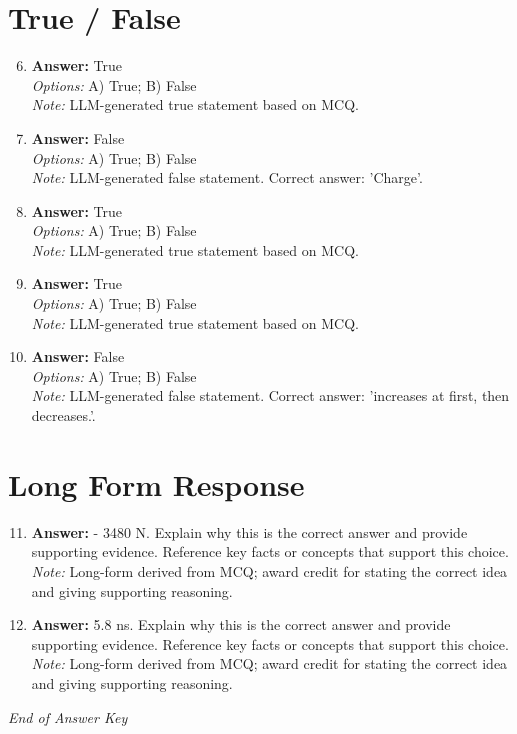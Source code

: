 \documentclass[12pt]{article}
\begin{document}
\section*{True / False}
\begin{enumerate}[label=\arabic*.]
\setcounter{enumi}{5}
\item \textbf{Answer:} True
\\ \textit{Options:} A) True; B) False
\\ \textit{Note:} LLM-generated true statement based on MCQ.
\item \textbf{Answer:} False
\\ \textit{Options:} A) True; B) False
\\ \textit{Note:} LLM-generated false statement. Correct answer: 'Charge'.
\item \textbf{Answer:} True
\\ \textit{Options:} A) True; B) False
\\ \textit{Note:} LLM-generated true statement based on MCQ.
\item \textbf{Answer:} True
\\ \textit{Options:} A) True; B) False
\\ \textit{Note:} LLM-generated true statement based on MCQ.
\item \textbf{Answer:} False
\\ \textit{Options:} A) True; B) False
\\ \textit{Note:} LLM-generated false statement. Correct answer: 'increases at first, then decreases.'.
\end{enumerate}

\section*{Long Form Response}
\begin{enumerate}[label=\arabic*.]
\setcounter{enumi}{10}
\item \textbf{Answer:} - 3480 N. Explain why this is the correct answer and provide supporting evidence. Reference key facts or concepts that support this choice.
\\ \textit{Note:} Long-form derived from MCQ; award credit for stating the correct idea and giving supporting reasoning.
\item \textbf{Answer:} 5.8 ns. Explain why this is the correct answer and provide supporting evidence. Reference key facts or concepts that support this choice.
\\ \textit{Note:} Long-form derived from MCQ; award credit for stating the correct idea and giving supporting reasoning.
\end{enumerate}

\vfill
\noindent\textit{End of Answer Key}
\end{document}
